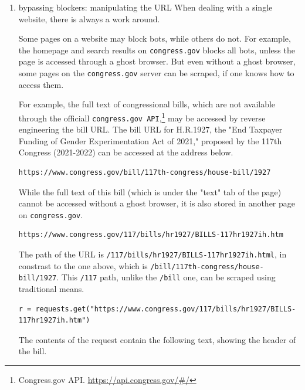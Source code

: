 \documentclass[11pt]{article}
\begin{document}
\begin{enumerate}
\begin{verbatim}
\end{verbatim}

If a ghost browser mimicks the user, then the XHR request thus mimicks
a web page itself, feigning a request encoded in the page's JavaScript
that would automatically load elements, like search results. 

\item bypassing blockers: manipulating the URL
\label{sec:org1d00adb}
When dealing with a single website, there is always a work around.

Some pages on a website may block bots, while others do not. For
example, the homepage and search results on \texttt{congress.gov} blocks all
bots, unless the page is accessed through a ghost browser. But even
without a ghost browser, some pages on the \texttt{congress.gov} server can
be scraped, if one knows how to access them.

For example, the full text of congressional bills, which are not
available through the officiall \texttt{congress.gov API},\footnote{Congress.gov API. \url{https://api.congress.gov/\#/}} may be
accessed by reverse engineering the bill URL. The bill URL for
H.R.1927, the "End Taxpayer Funding of Gender Experimentation Act of
2021," proposed by the 117th Congress (2021-2022) can be accessed
at the address below.

\begin{verbatim}
https://www.congress.gov/bill/117th-congress/house-bill/1927
\end{verbatim}

While the full text of this bill (which is under the "text" tab of the
page) cannot be accessed without a ghost browser, it is also stored in
another page on \texttt{congress.gov}.

\begin{verbatim}
https://www.congress.gov/117/bills/hr1927/BILLS-117hr1927ih.htm
\end{verbatim}

The path of the URL is \texttt{/117/bills/hr1927/BILLS-117hr1927ih.html}, in
constrast to the one above, which is
\texttt{/bill/117th-congress/house-bill/1927}. This \texttt{/117} path, unlike the
\texttt{/bill} one, can be scraped using traditional means.

\begin{verbatim}
r = requests.get("https://www.congress.gov/117/bills/hr1927/BILLS-117hr1927ih.htm")
\end{verbatim}

The contents of the request contain the following text, showing the
header of the bill.


\end{enumerate}
\end{document}
